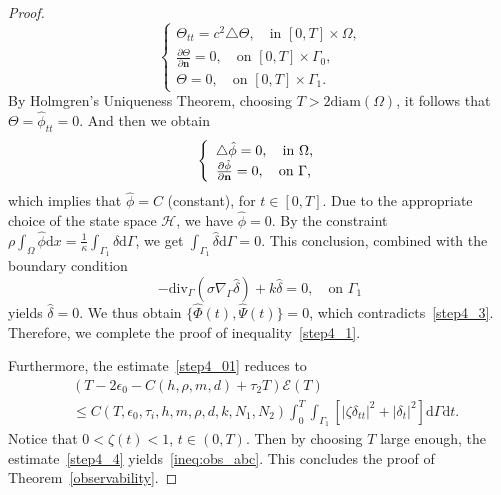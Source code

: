 \documentclass[10pt]{elsarticle}
\begin{document}
\begin{proof}
\begin{equation*}
\left
    \{
        \begin{array}{ll}
             \Theta_{tt} = c^2\triangle \Theta, \quad \textrm{in $[0, T] \times \Omega$,}\\
            \frac{\partial \Theta}{\partial \mathbf{n}}= 0, \quad \textrm{on $[0, T] \times \Gamma_0$,}\\
            \Theta = 0,  \quad \textrm{on $[0, T] \times \Gamma_1$}.   
        \end{array} 
\right.
\end{equation*}
By Holmgren's Uniqueness Theorem, choosing $T>2\textrm{diam}(\Omega)$, it follows that $\Theta=\hat{\phi}_{tt}=0$. And then we obtain
\begin{equation*}
\left
    \{
        \begin{array}{ll}
             \triangle\hat{\phi} = 0, \quad \textrm{in $ \Omega$,}\\
            \frac{\partial \hat{\phi}}{\partial \mathbf{n}}= 0, \quad \textrm{on $ \Gamma$,} 
        \end{array} 
\right.
\end{equation*}
which implies that $\hat{\phi}=C$ (constant), for $t\in [0, T]$. Due to the appropriate choice of the state space $\mathcal{H}$, we have $\hat{\phi}=0$. By the constraint $\rho\int_{\Omega}\hat{\phi}\mathrm{d}x = \frac{1}{\kappa}\int_{\Gamma_1}\hat{\delta}\mathrm{d}\Gamma$, we get $\int_{\Gamma_1}\hat{\delta}\mathrm{d}\Gamma=0$.
This conclusion, combined with the boundary condition
\[
- \mathrm{div}_{\Gamma}\left(\sigma\nabla_{\Gamma} \hat{\delta}\right) + k \hat{\delta} = 0, \quad \textrm{on $\Gamma_1$}
\]
yields $\hat{\delta} = 0$.
We thus obtain $\{\hat{\Phi}(t), \hat{\Psi}(t)\}=0$, which contradicts~\eqref{step4_3}. Therefore, we complete the proof of inequality~\eqref{step4_1}.

Furthermore, the estimate~\eqref{step4_01} reduces to
\begin{equation}\label{step4_4}
\begin{split}
&(T-2\epsilon_0 - C(h, \rho, m, d)+\tau_2 T)\mathcal{E}(T) \\
&\leqslant C(T, \epsilon_0, \tau_i, h, m, \rho, d, k, N_1, N_2)\int_{0}^{T}\int_{\Gamma_1}\left[|\zeta \delta_{tt}|^2 +|\delta_t|^2 \right]\mathrm{d}\Gamma \mathrm{d}t.
\end{split}
\end{equation}
Notice that $0<\zeta(t)<1$, $t\in(0, T)$. Then by choosing $T$ large enough, the estimate~\eqref{step4_4} yields~\eqref{ineq:obs_abc}. This concludes the proof of Theorem~\ref{observability}.
\end{proof}
\end{document}
